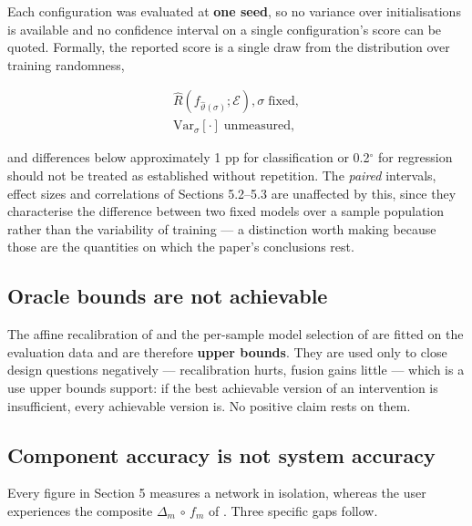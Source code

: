 Each configuration was evaluated at \textbf{one seed}, so no variance over initialisations is available and no confidence interval on a single configuration's score can be quoted. Formally, the reported score is a single draw from the distribution over training randomness,

\begin{equation}
\label{eq:305}
\begin{aligned}
\hat{R}( f_{\hat{\vartheta }(\sigma )} ; \mathcal{E} ) , \sigma \;\text{fixed}, \\
\mathrm{Var}_{\sigma} [ \cdot ] \;\text{unmeasured} ,
\end{aligned}
\end{equation}

and differences below approximately 1 pp for classification or 0.2$^{\circ}$ for regression should not be treated as established without repetition. The \emph{paired} intervals, effect sizes and correlations of Sections 5.2--5.3 are unaffected by this, since they characterise the difference between two fixed models over a sample population rather than the variability of training --- a distinction worth making because those are the quantities on which the paper's conclusions rest.

\FloatBarrier

\subsection{Oracle bounds are not achievable}

The affine recalibration of  and the per-sample model selection of  are fitted on the evaluation data and are therefore \textbf{upper bounds}. They are used only to close design questions negatively --- recalibration hurts, fusion gains little --- which is a use upper bounds support: if the best achievable version of an intervention is insufficient, every achievable version is. No positive claim rests on them.

\FloatBarrier

\subsection{Component accuracy is not system accuracy}

Every figure in Section 5 measures a network in isolation, whereas the user experiences the composite $\Delta_{m}$ $\circ$ $f_{m}$ of . Three specific gaps follow.


